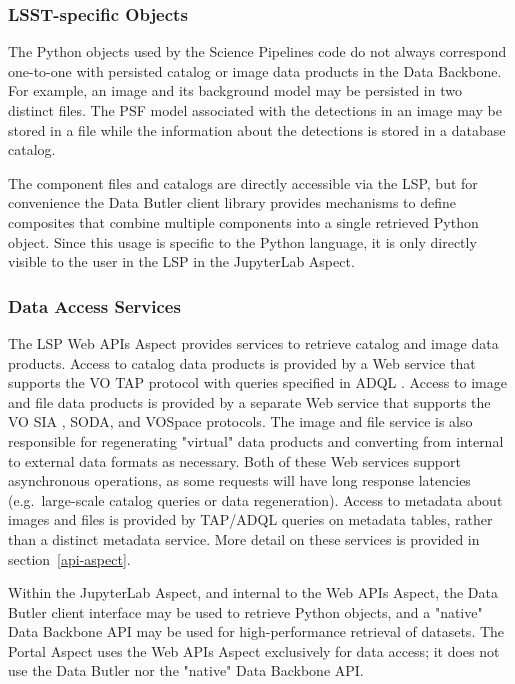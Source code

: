 \subsubsection{LSST-specific Objects}\label{lsst-specific-objects}

The Python objects used by the Science Pipelines code do not always
correspond one-to-one with persisted catalog or image data products in the
Data Backbone.  For example, an image and its background model may be persisted
in two distinct files.  The PSF model associated with the detections in an
image may be stored in a file while the information about the detections is
stored in a database catalog.

The component files and catalogs are directly accessible via the LSP, but
for convenience the Data Butler client library provides mechanisms to define
composites that combine multiple components into a single retrieved Python
object.  Since this usage is specific to the Python language, it is only
directly visible to the user in the LSP in the JupyterLab Aspect.

\subsubsection{Data Access Services}\label{data-access-services}

The LSP Web APIs Aspect provides services to retrieve catalog and image data
products.  Access to catalog data products is provided by a Web service that
supports the VO TAP protocol \citep{2010ivoa.spec.0327D} with queries specified in ADQL \citep{2008ivoa.spec.1030O}.
Access to image
and file data products is provided by a separate Web service that supports the
VO SIA \citep{2015ivoa.spec.1223D}, SODA, and VOSpace \citep{2013ivoa.spec.0329G} protocols.  The image and file service is also
responsible for regenerating "virtual" data products and converting from
internal to external data formats as necessary.  Both of these Web services
support asynchronous operations, as some requests will have long response
latencies (e.g.\  large-scale catalog queries or data regeneration).  Access to
metadata about images and files is provided by TAP/ADQL queries on metadata
tables, rather than a distinct metadata service.  More detail on these services
is provided in section~\ref{api-aspect}.

Within the JupyterLab Aspect, and internal to the Web APIs Aspect, the Data
Butler client interface may be used to retrieve Python objects, and a
"native" Data Backbone API may be used for high-performance retrieval of
datasets.  The Portal Aspect uses the Web APIs Aspect exclusively for data
access; it does not use the Data Butler nor the "native" Data Backbone API.

